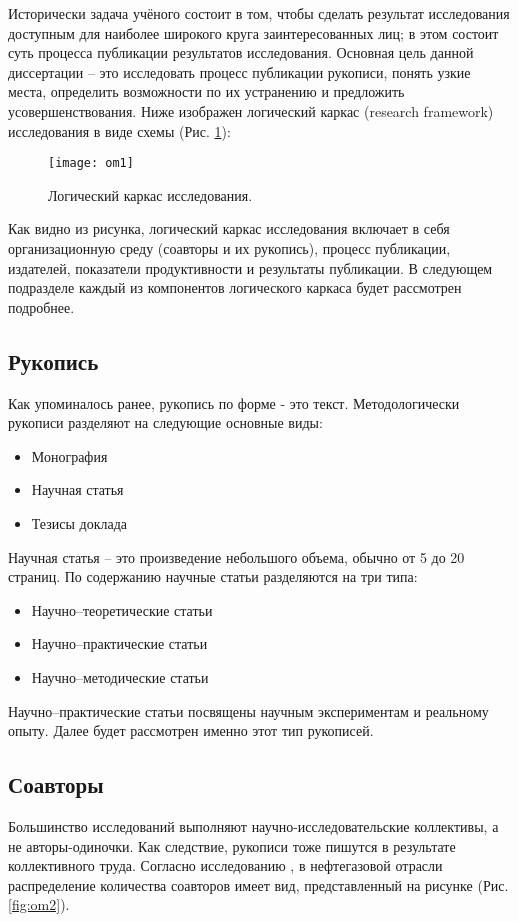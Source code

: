 Исторически задача учёного состоит в том, чтобы сделать результат исследования доступным для наиболее широкого круга заинтересованных лиц; в этом состоит суть процесса публикации результатов исследования. 
Основная цель данной диссертации – это исследовать процесс публикации рукописи, понять узкие места, определить возможности по их устранению и предложить усовершенствования. 
Ниже изображен логический каркас (research framework) исследования в виде схемы (Рис. \ref{fig:om1}): 

\begin{figure}[H]
  \centering
    \texttt{[image: om1]}
  \label{fig:om1}
  \caption{Логический каркас исследования.}
\end{figure}  
Как видно из рисунка, логический каркас исследования включает в себя организационную среду (соавторы и их рукопись), процесс публикации, издателей, показатели продуктивности и результаты публикации.
В следующем подразделе каждый из компонентов логического каркаса будет рассмотрен подробнее.

\subsection{Рукопись}
Как упоминалось ранее, рукопись по форме - это текст.
Методологически рукописи разделяют на следующие основные виды:
\begin{itemize}
\tightlist
\item Монография
\item Научная статья
\item Тезисы доклада
\end{itemize}

Научная статья – это произведение небольшого объема, обычно от 5 до 20 страниц. По содержанию научные статьи разделяются на три типа: 
\begin{itemize}
\tightlist
\item Научно–теоретические статьи
\item Научно–практические статьи
\item Научно–методические статьи
\end{itemize}
Научно–практические статьи посвящены научным экспериментам и реальному опыту. 
Далее будет рассмотрен именно этот тип рукописей.

\subsection{Соавторы}
Большинство исследований выполняют научно-исследовательские коллективы, а не авторы-одиночки. Как следствие, рукописи тоже пишутся в результате коллективного труда. Согласно исследованию \cite{kradoya2016structure}, в нефтегазовой отрасли распределение количества соавторов имеет вид, представленный на рисунке (Рис. \ref{fig:om2}).

